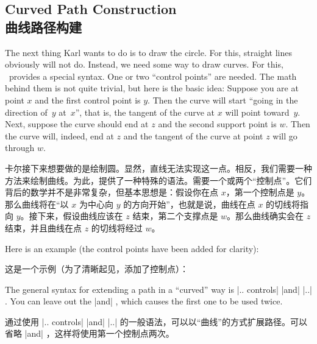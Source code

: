 

\subsection{Curved Path Construction\\曲线路径构建}

The next thing Karl wants to do is to draw the circle. For this, straight lines
obviously will not do. Instead, we need some way to draw curves. For this,
\tikzname\ provides a special syntax. One or two ``control points'' are needed.
The math behind them is not quite trivial, but here is the basic idea: Suppose
you are at point $x$ and the first control point is $y$. Then the curve will
start ``going in the direction of~$y$ at~$x$'', that is, the tangent of the
curve at $x$ will point toward~$y$. Next, suppose the curve should end at $z$
and the second support point is $w$. Then the curve will, indeed, end at $z$
and the tangent of the curve at point $z$ will go through $w$.

卡尔接下来想要做的是绘制圆。显然，直线无法实现这一点。相反，我们需要一种方法来绘制曲线。为此，\tikzname 提供了一种特殊的语法。需要一个或两个“控制点”。它们背后的数学并不是非常复杂，但基本思想是：假设你在点 $x$，第一个控制点是 $y$。那么曲线将在“以 $x$ 为中心向 $y$ 的方向开始”，也就是说，曲线在点 $x$ 的切线将指向 $y$。接下来，假设曲线应该在 $z$ 结束，第二个支撑点是 $w$。那么曲线确实会在 $z$ 结束，并且曲线在点 $z$ 的切线将经过 $w$。

Here is an example (the control points have been added for clarity):

这是一个示例（为了清晰起见，添加了控制点）：
%
\begin{codeexample}[]
\end{codeexample}

The general syntax for extending a path in a ``curved'' way is |.. controls|
 |and|  |..|
. You can leave out the |and| ,
which causes the first one to be used twice.

通过使用 |.. controls|  |and|  |..|  的一般语法，可以以“曲线”的方式扩展路径。可以省略 |and| ，这样将使用第一个控制点两次。

